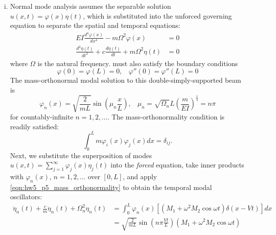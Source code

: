 \begin{enumerate}[(i)]
\item { %
    Normal mode analysis assumes the separable solution $u(x, t) = \varphi(x) \eta(t)$, which is substituted into the unforced governing equation to separate the spatial and temporal equations:
    \begin{subequations}
    \begin{align}
        \label{eqn:hw5_p5_spatial_eqn} EI \frac{d^4 \varphi(x)}{dx^4} - m \Omega^2 \varphi(x) &= 0 \\ 
        \frac{d^2 \eta(t)}{dt^2} + c \frac{d\eta(t)}{dt} + m \Omega^2 \eta(t) &= 0
    \end{align}
    \end{subequations}
    where $\Omega$ is the natural frequency. 
     must also satisfy the boundary conditions 
    \begin{equation}
        \varphi(0) = \varphi(L) = 0, ~~~~ \varphi''(0) = \varphi''(L) = 0
    \end{equation}
    The mass-orthonormal modal solution to this double-simply-supported beam is 
    \begin{equation}
        \varphi_n(x) = \sqrt{\frac{2}{mL}} \sin \left(\mu_n \frac{x}{L}\right), ~~~~ \mu_n = \sqrt{\Omega_n} L {\left(\frac{m}{EI}\right)}^{\frac{1}{4}} = n\pi
    \end{equation}
    for countably-infinite $n = 1, 2, \ldots$.
    The mass-orthonormality condition is readily satisfied:
    \begin{equation}\label{eqn:hw5_p5_mass_orthonormality}
        \int_0^L m \varphi_i(x) \varphi_j(x) dx = \delta_{ij}.
    \end{equation}
    Next, we substitute the superposition of modes $u(x, t) = \sum_{j=1}^\infty \varphi_j(x) \eta_j(t)$ into the \emph{forced} equation, take inner products with $\varphi_n(x)$, $n = 1, 2, \ldots$ over $[0, L]$, and apply \cref{eqn:hw5_p5_mass_orthonormality} to obtain the temporal modal oscillators:
    \begin{equation}\label{eqn:hw5_p5_modal_oscillators}
    \begin{aligned}
        \ddot{\eta}_n(t) + \frac{c}{m} \dot{\eta}_n(t) + \Omega_n^2 \eta_n(t) &= \int_0^L \varphi_n(x) \left[(M_1 + \omega^2 M_2 \cos\omega t) \delta(x - Vt)\right] dx \\
        &= \sqrt{\frac{2}{mL}} \sin \left( n \pi \frac{Vt}{L} \right) (M_1 + \omega^2 M_2 \cos\omega t) \\

\end{aligned}
\end{equation}}
\end{enumerate}
